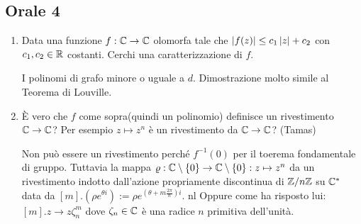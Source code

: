 \documentclass[]{article}
\begin{document}
\subsection{Orale 4}
\begin{enumerate}
    \item Data una funzione $f: \mathbb{C} \to \mathbb{C}$ olomorfa tale che $\left| f(z) \right| \leq c_1\left| z \right| + c_2$ con $c_1,c_2 \in \mathbb{R}$ costanti.
        Cerchi una caratterizzazione di $f$.
        \begin{answer}
            I polinomi di grafo minore o uguale a $d$. Dimostrazione molto simile al Teorema di Louville.
        \end{answer}
    \item \`E vero che $f$ come sopra(quindi un polinomio) definisce un rivestimento $\mathbb{C} \to \mathbb{C}$? Per esempio $z \mapsto z^n$ \`e un rivestimento da $\mathbb{C} \to \mathbb{C}$? (Tamas)
        \begin{answer}
            Non pu\`o essere un rivestimento perch\'e $f^{-1}(0)$ per il toerema fondamentale di gruppo. \nl
            Tuttavia la mappa $\varrho: \mathbb{C} \setminus \left\{ 0 \right\} \to \mathbb{C} \setminus \left\{ 0 \right\}: z \mapsto z^n$ da un rivestimento
            indotto dall'azione propriamente discontinua di $\mathbb{Z} / n\mathbb{Z}$ su $\mathbb{C}^*$ data da $[m].(\rho e^{\theta i}) := \rho e^{\left(\theta+ m\frac{2 \pi}{n}\right)i}$. nl
            Oppure come ha risposto lui: $[m].z \to z \zeta_n^m$ dove $\zeta_n \in \mathbb{C}$ \`e una radice $n$ primitiva dell'unit\`a.
        \end{answer}
\end{enumerate}
\end{document}
